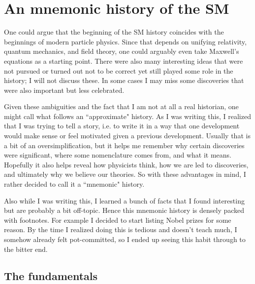 \section{An mnemonic history of the SM}

One could argue that the beginning of the SM history coincides with the
beginnings of modern particle physics. Since that depends on unifying
relativity, quantum mechanics, and field theory, one could arguably even take
Maxwell's equations as a starting point. 
There were also many interesting ideas that were not pursued or turned out
not to be correct yet still played some role in the history; I will not
discuss these. In some cases I may miss some discoveries that were also
important but less celebrated.

Given these ambiguities and the fact
that I am not at all a real historian, 
one might call what follows an ``approximate" history.
As I was writing this, I realized that I was trying to tell a story, i.e.
to write it in a way that one development would make sense or feel
motivated given a previous development. Usually that is a bit of an
oversimplification, but it helps me remember why certain discoveries were
significant, where some nomenclature comes from, and what it means. Hopefully it
also helps reveal how physicists think, how we are led to discoveries, and
ultimately why we believe our theories. So with these advantages in mind, I
rather decided to call it a ``mnemonic" history. 

Also while I was writing this, I learned a bunch of facts that I found
interesting but are probably a bit off-topic. Hence this mnemonic history is
densely packed with footnotes. For example I decided to start listing Nobel
prizes for some reason. By the time I realized doing this is tedious and doesn't
teach much, I somehow already felt pot-committed, so I ended up seeing this habit
through to the bitter end. 

\subsection{The fundamentals}


